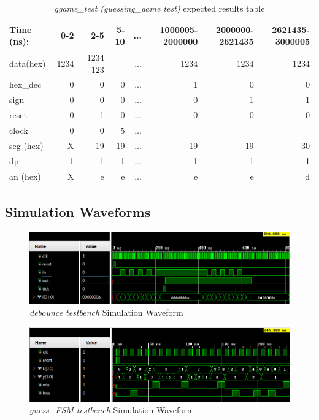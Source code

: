 \documentclass[11pt]{article}
\begin{document}
\begin{table}[ht]\centering
	\caption{\textit{ggame\_test (guessing\_game test)} expected results table}
	\label{ALU:tbl:alu_ERT}\medskip
	\begin{tabular}{l|rrrrrrr}
		Time (ns): & 0-2 & 2-5 & 5-10 & ... & 1000005-2000000 & 2000000-2621435 & 2621435-3000005\\
		\midrule
		data(hex) & 1234 & 1234 123 && ... & 1234  & 1234 & 1234  \\
		hex\_dec & 0 & 0 & 0 & ... & 1 &  0 & 0\\
		sign & 0 & 0 & 0 & ... & 0 &  1 & 1 \\
		reset & 0 & 1 & 0 & ... & 0 & 0 & 0  \\
		clock & 0 & 0 & 5 & ...  \\
		\midrule
		seg (hex) & X & 19 & 19 & ... & 19 & 19 & 30 \\
		dp & 1 & 1 & 1 & ... & 1 & 1 & 1 \\
		an (hex)& X & e & e & ... & e & e & d \\
		\bottomrule
	\end{tabular}
\end{table}

\clearpage
 
\subsection*{Simulation Waveforms}
\begin{figure}[ht]\centering
	\includegraphics[width=1.1\textwidth]{debouncetest}
	\caption{\textit{debounce testbench} Simulation Waveform}
	\label{fig:sim_with_table}
\end{figure}

\begin{figure}[ht]\centering
	\includegraphics[width=1.1\textwidth]{gsfmtest}
	\caption{\textit{guess\_FSM testbench} Simulation Waveform}
	\label{fig:sim_with_table}
\end{figure}
\end{document}

